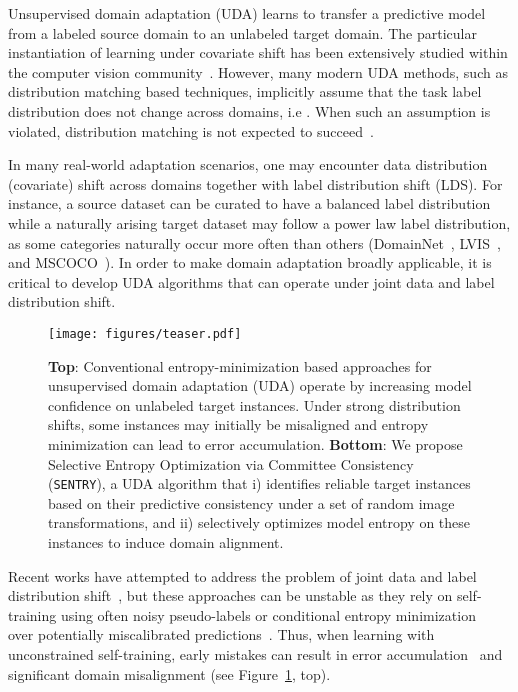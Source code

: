 \documentclass[10pt,twocolumn,letterpaper]{article}
\newcommand{\method}{\texttt{SENTRY}\xspace}
\begin{document}
Unsupervised domain adaptation (UDA) learns to transfer a predictive model from a labeled source domain to an unlabeled target domain. The particular instantiation of learning under covariate shift has been extensively studied within the computer vision community~\cite{ganin2014unsupervised,hoffman2017cycada,long2015learning,saenko2010adapting,tzeng2017adversarial,tzeng2014deep}.
However, many modern UDA methods, such as distribution matching based techniques,
implicitly assume that the task label distribution does not change across domains, i.e . When such an assumption is violated, distribution matching is not expected to succeed~\cite{li2020rethinking,wu2019domain}.
   
In many real-world adaptation scenarios, one may encounter data distribution (\ie covariate) shift across domains together with label distribution shift (LDS). For instance, a source dataset can be curated to have a balanced label distribution while a naturally arising target dataset may follow a power law label distribution, as some categories naturally occur more often than others (\eg DomainNet~\cite{peng2019moment}, LVIS~\cite{gupta2019lvis}, and MSCOCO~\cite{lin2014microsoft}). In order to make domain adaptation broadly applicable, it is critical to develop UDA algorithms that can operate under joint data and label distribution shift.
   
\begin{figure}[t]
   \centering
    \vspace{-10pt}
   \noindent\texttt{[image: figures/teaser.pdf]}
   \caption{
   \textbf{Top}: Conventional entropy-minimization based approaches for unsupervised domain adaptation (UDA) operate by increasing model confidence on unlabeled target instances. Under strong distribution shifts, some instances may initially be misaligned and entropy minimization can lead to error accumulation. \textbf{Bottom}: We propose Selective Entropy Optimization via Committee Consistency (\method), a UDA algorithm that i) identifies reliable target instances based on their predictive consistency under a set of random image transformations, and ii) selectively optimizes model entropy on these instances to induce domain alignment. }
   \label{fig:teaser}
   \vspace*{-7pt}
\end{figure}


Recent works have attempted to address the problem of joint data and label distribution shift~\cite{li2020rethinking,tan2019generalized}, but these approaches can be unstable as they rely on self-training using often noisy pseudo-labels or conditional entropy minimization~\cite{li2020rethinking} over potentially miscalibrated predictions~\cite{guo2017calibration,snoek2019can}. Thus, when learning with unconstrained self-training, early mistakes can result in error accumulation~\cite{chen2019progressive} and significant domain misalignment (see Figure~\ref{fig:teaser}, top).
   
\end{document}
